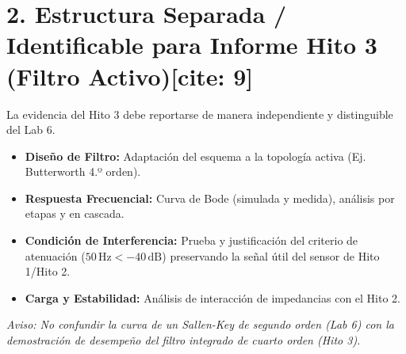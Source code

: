 \documentclass[10pt, a4paper]{article}
\begin{document}
\section*{2. Estructura Separada / Identificable para Informe Hito 3 (Filtro Activo)[cite: 9]}
La evidencia del Hito 3 debe reportarse de manera independiente y distinguible del Lab 6.
\begin{itemize}
    \setlength{\itemsep}{2pt}
    \item \textbf{Diseño de Filtro:} Adaptación del esquema a la topología activa (Ej. Butterworth 4.º orden).
    \item \textbf{Respuesta Frecuencial:} Curva de Bode (simulada y medida), análisis por etapas y en cascada.
    \item \textbf{Condición de Interferencia:} Prueba y justificación del criterio de atenuación ($50\,\text{Hz} < -40\,\text{dB}$) preservando la señal útil del sensor de Hito 1/Hito 2.
    \item \textbf{Carga y Estabilidad:} Análisis de interacción de impedancias con el Hito 2.
\end{itemize}
\textit{Aviso: No confundir la curva de un Sallen-Key de segundo orden (Lab 6) con la demostración de desempeño del filtro integrado de cuarto orden (Hito 3).}
\end{document}
